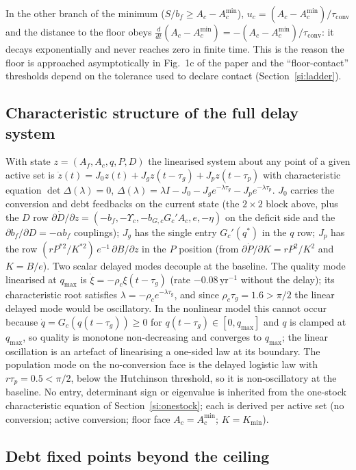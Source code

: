 \documentclass[11pt,a4paper]{article}
\newcommand{\Ups}{\Upsilon_c}
\newcommand{\Acmin}{A_c^{\min}}
\newcommand{\tconv}{\tau_{\mathrm{conv}}}
\begin{document}
In the other branch of the minimum ($S/b_f\ge A_c-\Acmin$), $u_c=(A_c-\Acmin)/\tconv$ and the distance to the floor obeys $\frac{d}{dt}(A_c-\Acmin)=-(A_c-\Acmin)/\tconv$: it decays exponentially and never reaches zero in finite time. This is the reason the floor is approached asymptotically in Fig.~1c of the paper and the ``floor-contact'' thresholds depend on the tolerance used to declare contact (Section~\ref{si:ladder}).

\subsection{Characteristic structure of the full delay system}\label{si:char}

With state $z=(A_f,A_c,q,P,D)$ the linearised system about any point of a given active set is $\dot z(t)=J_0z(t)+J_gz(t-\tau_g)+J_pz(t-\tau_p)$ with characteristic equation $\det\Delta(\lambda)=0$, $\Delta(\lambda)=\lambda I-J_0-J_ge^{-\lambda\tau_g}-J_pe^{-\lambda\tau_p}$. $J_0$ carries the conversion and debt feedbacks on the current state (the $2\times2$ block above, plus the $D$ row $\partial\dot D/\partial z=(-b_f,-\Ups,-b_{G,c}G_c'A_c,e,-\eta)$ on the deficit side and the $\partial b_f/\partial D=-\alpha b_f$ couplings); $J_g$ has the single entry $G_c'(q^*)$ in the $q$ row; $J_p$ has the row $(rP^{*2}/K^{*2})\,e^{-1}\,\partial B/\partial z$ in the $P$ position (from $\partial\dot P/\partial K=rP^2/K^2$ and $K=B/e$). Two scalar delayed modes decouple at the baseline. The quality mode linearised at $q_{\max}$ is $\dot\xi=-\rho_c\xi(t-\tau_g)$ (rate $-0.08\,\mathrm{yr}^{-1}$ without the delay); its characteristic root satisfies $\lambda=-\rho_ce^{-\lambda\tau_g}$, and since $\rho_c\tau_g=1.6>\pi/2$ the linear delayed mode would be oscillatory. In the nonlinear model this cannot occur because $\dot q=G_c(q(t-\tau_g))\ge0$ for $q(t-\tau_g)\in[0,q_{\max}]$ and $q$ is clamped at $q_{\max}$, so quality is monotone non-decreasing and converges to $q_{\max}$; the linear oscillation is an artefact of linearising a one-sided law at its boundary. The population mode on the no-conversion face is the delayed logistic law with $r\tau_p=0.5<\pi/2$, below the Hutchinson threshold, so it is non-oscillatory at the baseline. No entry, determinant sign or eigenvalue is inherited from the one-stock characteristic equation of Section~\ref{si:onestock}; each is derived per active set (no conversion; active conversion; floor face $A_c=\Acmin$; $K=K_{\min}$).

\subsection{Debt fixed points beyond the ceiling}\label{si:debt}
\end{document}

